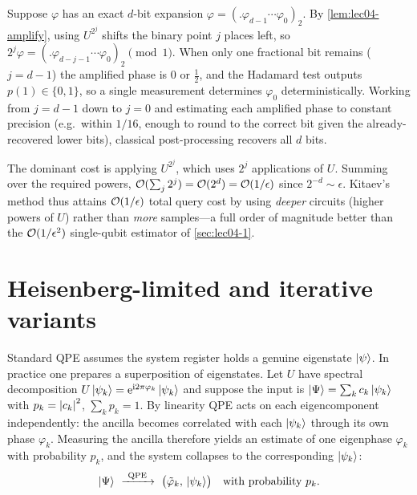 Suppose $\varphi$ has an exact $d$-bit expansion
$\varphi=(.\varphi_{d-1}\cdots\varphi_0)_2$. By \cref{lem:lec04-amplify}, using
$U^{2^{j}}$ shifts the binary point $j$ places left, so $2^{j}\varphi
=(.\varphi_{d-j-1}\cdots\varphi_0)_2\pmod1$. When only one fractional bit remains
($j=d-1$) the amplified phase is $0$ or $\tfrac12$, and the Hadamard test outputs
$p(1)\in\{0,1\}$, so a single measurement determines $\varphi_0$
deterministically. Working from $j=d-1$ down to $j=0$ and estimating each
amplified phase to constant precision (e.g.\ within $1/16$, enough to round to
the correct bit given the already-recovered lower bits), classical
post-processing recovers all $d$ bits.

\begin{remark}
\label{rem:lec04-depth}
The dominant cost is applying $U^{2^{j}}$, which uses $2^{j}$ applications of $U$.
Summing over the required powers,
$\mathcal{O}(\sum_{j}2^{j})=\mathcal{O}(2^{d})=\mathcal{O}(1/\epsilon)$ since $2^{-d}\sim\epsilon$.
Kitaev's method thus attains $\mathcal{O}(1/\epsilon)$ total query cost by using
\emph{deeper} circuits (higher powers of $U$) rather than \emph{more} samples---a
full order of magnitude better than the $\mathcal{O}(1/\epsilon^{2})$ single-qubit
estimator of \cref{sec:lec04-1}.
\end{remark}

\section{Heisenberg-limited and iterative variants}
\label{sec:lec04-5}

Standard QPE assumes the system register holds a genuine eigenstate $\ket{\psi}$.
In practice one prepares a superposition of eigenstates. Let $U$ have spectral
decomposition $U\ket{\psi_k}=\mathrm{e}^{\mathrm{i} 2\pi\varphi_k}\ket{\psi_k}$ and suppose the
input is $\ket{\Psi}=\sum_k c_k\ket{\psi_k}$ with $p_k=\left\lvert c_k \right\rvert^2$,
$\sum_k p_k=1$. By linearity QPE acts on each eigencomponent independently: the
ancilla becomes correlated with each $\ket{\psi_k}$ through its own phase
$\varphi_k$. Measuring the ancilla therefore yields an estimate of one eigenphase
$\varphi_k$ with probability $p_k$, and the system collapses to the corresponding
$\ket{\psi_k}$:
\begin{equation}
\label{eq:lec04-collapse}
  \ket{\Psi}\ \xrightarrow{\ \mathrm{QPE}\ }\
  \bigl(\tilde\varphi_k,\,\ket{\psi_k}\bigr)\quad\text{with probability }p_k.
\end{equation}

